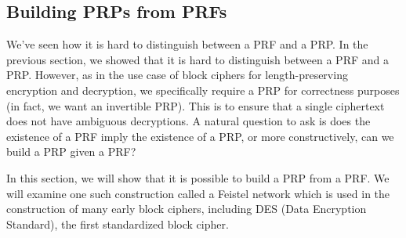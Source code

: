 \subsection{Building PRPs from PRFs}
We've seen how it is hard to distinguish between a PRF and a PRP.
In the previous section, we showed that it is hard to distinguish between a PRF and a PRP.
However, as in the use case of block ciphers for length-preserving encryption and decryption, we specifically require a PRP for correctness purposes (in fact, we want an invertible PRP).
This is to ensure that a single ciphertext does not have ambiguous decryptions.
A natural question to ask is does the existence of a PRF imply the existence of a PRP, or more constructively, can we build a PRP given a PRF?

In this section, we will show that it is possible to build a PRP from a PRF.
We will examine one such construction called a Feistel network which is used in the construction of many early block ciphers, including DES (Data Encryption Standard), the first standardized block cipher.

